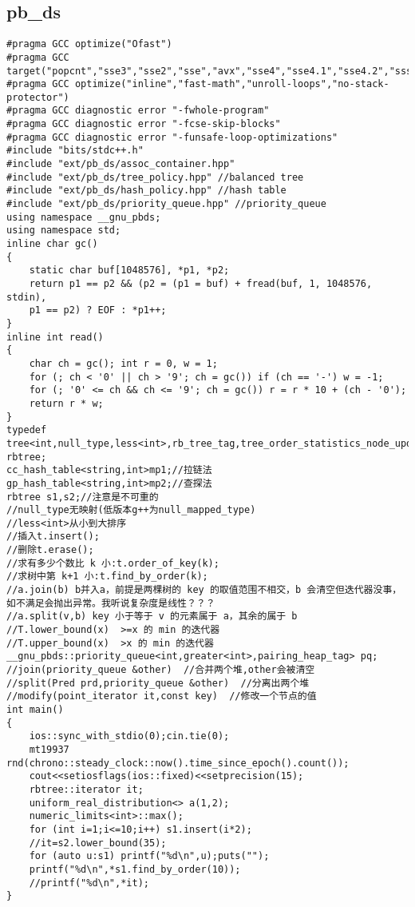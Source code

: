 \documentclass[12pt]{ctexart}
\begin{document}
\subsection{pb\_ds}

\begin{lstlisting}
#pragma GCC optimize("Ofast")
#pragma GCC target("popcnt","sse3","sse2","sse","avx","sse4","sse4.1","sse4.2","ssse3","f16c","fma","avx2","xop","fma4")
#pragma GCC optimize("inline","fast-math","unroll-loops","no-stack-protector")
#pragma GCC diagnostic error "-fwhole-program"
#pragma GCC diagnostic error "-fcse-skip-blocks"
#pragma GCC diagnostic error "-funsafe-loop-optimizations"
#include "bits/stdc++.h"
#include "ext/pb_ds/assoc_container.hpp"
#include "ext/pb_ds/tree_policy.hpp" //balanced tree
#include "ext/pb_ds/hash_policy.hpp" //hash table
#include "ext/pb_ds/priority_queue.hpp" //priority_queue
using namespace __gnu_pbds;
using namespace std;
inline char gc()
{
    static char buf[1048576], *p1, *p2;
    return p1 == p2 && (p2 = (p1 = buf) + fread(buf, 1, 1048576, stdin),
    p1 == p2) ? EOF : *p1++;
}
inline int read()
{
    char ch = gc(); int r = 0, w = 1;
    for (; ch < '0' || ch > '9'; ch = gc()) if (ch == '-') w = -1;
    for (; '0' <= ch && ch <= '9'; ch = gc()) r = r * 10 + (ch - '0');
    return r * w;
}
typedef tree<int,null_type,less<int>,rb_tree_tag,tree_order_statistics_node_update> rbtree;
cc_hash_table<string,int>mp1;//拉链法
gp_hash_table<string,int>mp2;//查探法
rbtree s1,s2;//注意是不可重的
//null_type无映射(低版本g++为null_mapped_type)
//less<int>从小到大排序
//插入t.insert();
//删除t.erase();
//求有多少个数比 k 小:t.order_of_key(k);
//求树中第 k+1 小:t.find_by_order(k);
//a.join(b) b并入a，前提是两棵树的 key 的取值范围不相交，b 会清空但迭代器没事，如不满足会抛出异常。我听说复杂度是线性？？？
//a.split(v,b) key 小于等于 v 的元素属于 a，其余的属于 b
//T.lower_bound(x)  >=x 的 min 的迭代器
//T.upper_bound(x)  >x 的 min 的迭代器
__gnu_pbds::priority_queue<int,greater<int>,pairing_heap_tag> pq;
//join(priority_queue &other)  //合并两个堆,other会被清空
//split(Pred prd,priority_queue &other)  //分离出两个堆
//modify(point_iterator it,const key)  //修改一个节点的值
int main()
{
	ios::sync_with_stdio(0);cin.tie(0);
	mt19937 rnd(chrono::steady_clock::now().time_since_epoch().count());
    cout<<setiosflags(ios::fixed)<<setprecision(15);
	rbtree::iterator it;
    uniform_real_distribution<> a(1,2);
	numeric_limits<int>::max();
	for (int i=1;i<=10;i++) s1.insert(i*2);
	//it=s2.lower_bound(35);
	for (auto u:s1) printf("%d\n",u);puts("");
	printf("%d\n",*s1.find_by_order(10));
	//printf("%d\n",*it);
}
\end{lstlisting}
\end{document}
